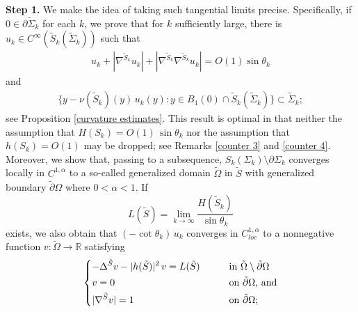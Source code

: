 \documentclass[11pt]{amsart}
\begin{document}
\textbf{Step 1.} We make the idea of taking such tangential limits precise. Specifically,  if $0\in \partial \tilde \Sigma_k$ for each $k$, we prove that for $k$ sufficiently large, there is $u_k\in C^\infty(\tilde S_k(\tilde \Sigma_k))$  such that \begin{align} \label{graphicality 0} u_k+|\nabla^{\tilde S_k} u_k|+|\nabla^{\tilde S_k}\nabla^{\tilde S_k}u_k|=O(1)\sin\theta_k\end{align}  and
\begin{align} \label{graphicality}
	 \{y-\nu(\tilde S_k)(y)\,u_k(y):y\in B_1(0)\cap \tilde S_k(\tilde \Sigma_k)\}\subset \tilde \Sigma_k;
	\end{align} see Proposition \ref{curvature estimates}. This result is optimal in that neither the assumption that $H(S_k)=O(1)\,\sin\theta_k$ nor the assumption that $h(S_k)=O(1)$ may be dropped; see Remarks \ref{counter 3} and \ref{counter 4}. Moreover, we show that, passing to a subsequence, $S_k(\Sigma_k)\setminus \partial \Sigma_k$ converges locally in $C^{1,\alpha}$ to a so-called generalized domain $\tilde \Omega$ in $\tilde S$ with generalized boundary $\tilde \partial \Omega$ where $0<\alpha<1$. If 
$$
L(\tilde S)=\lim_{k\to\infty} \frac{H(\tilde S_k)}{\sin \theta_k}
$$
exists, we also obtain that $(-\cot\theta_k)\,u_k$ converges in $C_{loc}^{1,\alpha}$ to a nonnegative function $v:\tilde \Omega\to \mathbb{R}$ satisfying 
\begin{align} \label{PDEintro}
	\begin{dcases}
	-\Delta^{\tilde S} v-|h(\tilde S)|^2\,v=L(\tilde S)\qquad&\text{in $\tilde\Omega\setminus \tilde \partial \Omega$}\\
		v=0&\text{on $\tilde \partial \Omega$, and}\\
		|\nabla^{\tilde S} v|=1&\text{on $\tilde \partial  \Omega;$}
	\end{dcases}
\end{align}
\end{document}
